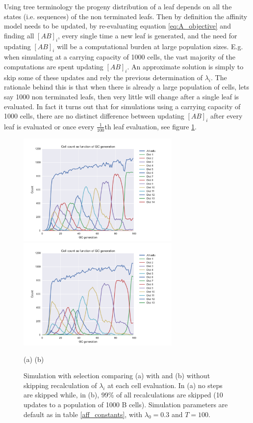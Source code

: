 Using tree terminology the progeny distribution of a leaf depends on all the states (i.e. sequences) of the non terminated leafs.
Then by definition the affinity model needs to be updated, by re-evaluating equation \ref{eq:A_objective} and finding all $[AB]_i$, every single time a new leaf is generated, and the need for updating $[AB]_i$ will be a computational burden at large population sizes.
E.g. when simulating at a carrying capacity of 1000 cells, the vast majority of the computations are spent updating $[AB]_i$.
An approximate solution is simply to skip some of these updates and rely the previous determination of $\lambda_i$.
The rationale behind this is that when there is already a large population of cells, lets say 1000 non terminated leafs, then very little will change after a single leaf is evaluated.
In fact it turns out that for simulations using a carrying capacity of 1000 cells, there are no distinct difference between updating $[AB]_i$ after every leaf is evaluated or once every $\frac{1}{100}$th leaf evaluation, see figure \ref{fig:skip_vs_no_skip_dist10}.
\begin{figure}[!ht]
\begin{center} 
\includegraphics[width=80mm]{figures/sim_selection_default_run_dist10.pdf}
\hspace{-22mm}
\includegraphics[width=80mm]{figures/sim_selection_default_run_dist10_no_skip.pdf} \newline%
\end{center}
\vspace{-9mm} \hspace{34mm} (a) \hspace{53mm} (b)
    \caption{
        \label{fig:skip_vs_no_skip_dist10}
        Simulation with selection comparing (a) with and (b) without skipping recalculation of $\lambda_i$ at each cell evaluation. In (a) no steps are skipped while, in (b), 99\% of all recalculations are skipped (10 updates to a population of 1000 B cells). Simulation parameters are default as in table \ref{aff_constants}, with $\lambda_0 = 0.3$ and $T=100$.
        }
\end{figure}

